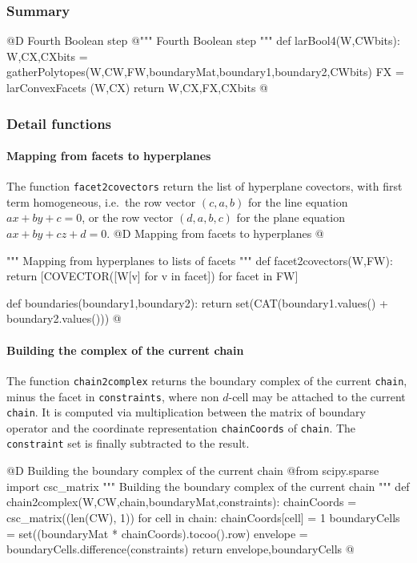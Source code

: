 \documentclass[11pt,oneside]{article}	%
\begin{document}
\subsubsection{Summary}


@D Fourth Boolean step
@{""" Fourth Boolean step """
def larBool4(W,CWbits):
	W,CX,CXbits = gatherPolytopes(W,CW,FW,boundaryMat,boundary1,boundary2,CWbits)
	FX = larConvexFacets (W,CX)		
	return W,CX,FX,CXbits
@}

\subsubsection{Detail functions}




\paragraph{Mapping from facets to hyperplanes}
The function \texttt{facet2covectors} return the list of hyperplane covectors, with first term homogeneous, i.e.~the row vector $(c,a,b)$ for the line equation $ax+by+c=0$, or the row vector $(d,a,b,c)$ for the plane equation $ax+by+cz+d=0$.
@D Mapping from facets to hyperplanes
@{""" Mapping from hyperplanes to lists of facets """
def facet2covectors(W,FW):
	return [COVECTOR([W[v] for v in facet]) for facet in FW]

def boundaries(boundary1,boundary2):
	return set(CAT(boundary1.values() + boundary2.values()))
@}

\paragraph{Building the complex of the current chain}
The function \texttt{chain2complex} returns the boundary complex of the current \texttt{chain}, minus the facet in \texttt{constraints}, where non $d$-cell may be attached to the current \texttt{chain}.
It is computed via multiplication between the matrix of boundary operator and the coordinate representation \texttt{chainCoords} of \texttt{chain}. The \texttt{constraint} set is finally subtracted to the result.  

@D Building the boundary complex of the current chain
@{from scipy.sparse import csc_matrix
""" Building the boundary complex of the current chain """
def chain2complex(W,CW,chain,boundaryMat,constraints):
	chainCoords = csc_matrix((len(CW), 1))
	for cell in chain: chainCoords[cell] = 1
	boundaryCells = set((boundaryMat * chainCoords).tocoo().row)
	envelope = boundaryCells.difference(constraints)
	return envelope,boundaryCells
@}
\end{document}
